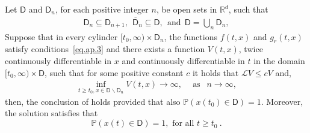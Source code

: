\begin{theorem}\label{theo.ap.2}
	Let $\mathsf{D}$ and $\mathsf{D}_{n}$, for each positive integer $n$, be open 
	sets in $\mathbb{R}^{d}$, such that
	\begin{eqnarray*}
		\mathsf{D}_{n}
		\subseteq 
		\mathsf{D}_{n+1},
		\ \ \overline{\mathsf{D}}_{n}
		\subseteq \mathsf{D},
		\ \ \mbox{and}
		\ \ \mathsf{D}
		=\displaystyle \bigcup_{n}{\mathsf{D}_{n}},
	\end{eqnarray*}
	Suppose that in every cylinder $[ t_{0},\infty)\times \mathsf{D}_{n}$, the 
	functions $f(t,x)$ and $g_r(t,x)$ satisfy conditions~\eqref{eq.ap.3} 
	and there exists a function $V(t,x)$, twice continuously differentiable in 
	$x$ and continuously differentiable in $t$ in the domain 
	$[ t_{0},\infty)\times \mathsf{D}$, such that for some positive constant $c$
	it holds that $\mathcal{L}V\leq cV$ and,
	\begin{eqnarray*}
		\inf_{t\geq t_{0}, 
		x \in \mathsf{D}
		\backslash 
		\mathsf{D}_{n}} 
		V(t,x)\to \infty ,
		\ \ \ \ \text{ as }
		\ \ n \to \infty,
	\end{eqnarray*}
	then, the conclusion of  holds provided that also 
$\mathbb{P}(x(t_{0})\in \mathsf{D})=1$. Moreover, the solution satisfies that 
$$
	\mathbb{P}(x(t)\in \mathsf{D})=1,\mbox{ for all }t\geq t_{0} ~.
$$
\end{theorem}